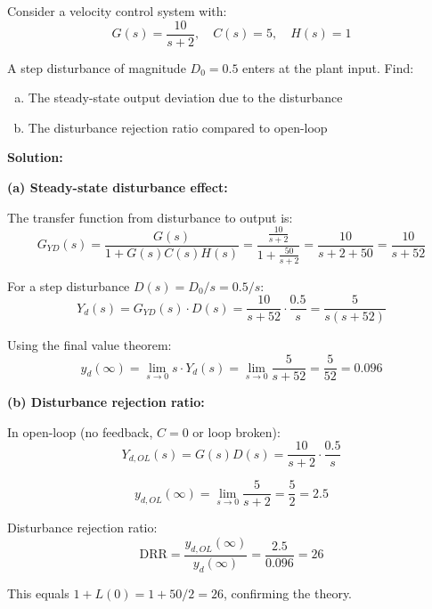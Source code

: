 \begin{examplebox}
Consider a velocity control system with:
\begin{equation}
G(s) = \frac{10}{s + 2}, \quad C(s) = 5, \quad H(s) = 1
\end{equation}

A step disturbance of magnitude $D_0 = 0.5$ enters at the plant input. Find:
\begin{enumerate}[(a)]
\item The steady-state output deviation due to the disturbance
\item The disturbance rejection ratio compared to open-loop
\end{enumerate}

\textbf{Solution:}

\textbf{(a) Steady-state disturbance effect:}

The transfer function from disturbance to output is:
\begin{equation}
G_{YD}(s) = \frac{G(s)}{1 + G(s)C(s)H(s)} = \frac{\frac{10}{s+2}}{1 + \frac{50}{s+2}} = \frac{10}{s + 2 + 50} = \frac{10}{s + 52}
\end{equation}

For a step disturbance $D(s) = D_0/s = 0.5/s$:
\begin{equation}
Y_d(s) = G_{YD}(s) \cdot D(s) = \frac{10}{s+52} \cdot \frac{0.5}{s} = \frac{5}{s(s+52)}
\end{equation}

Using the final value theorem:
\begin{equation}
y_d(\infty) = \lim_{s \to 0} s \cdot Y_d(s) = \lim_{s \to 0} \frac{5}{s + 52} = \frac{5}{52} = 0.096
\end{equation}

\textbf{(b) Disturbance rejection ratio:}

In open-loop (no feedback, $C = 0$ or loop broken):
\begin{equation}
Y_{d,OL}(s) = G(s) D(s) = \frac{10}{s+2} \cdot \frac{0.5}{s}
\end{equation}

\begin{equation}
y_{d,OL}(\infty) = \lim_{s \to 0} \frac{5}{s+2} = \frac{5}{2} = 2.5
\end{equation}

Disturbance rejection ratio:
\begin{equation}
\text{DRR} = \frac{y_{d,OL}(\infty)}{y_d(\infty)} = \frac{2.5}{0.096} = 26
\end{equation}

This equals $1 + L(0) = 1 + 50/2 = 26$, confirming the theory.
\end{examplebox}

